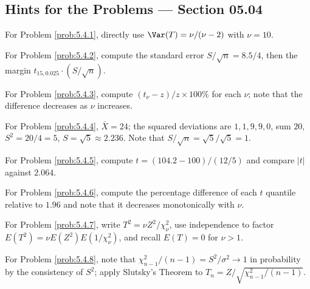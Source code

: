 \subsection*{Hints for the Problems --- Section 05.04}

\begin{sugerencia}
	\label{sug:5.4.1}
	For Problem \ref{prob:5.4.1}, directly use $\Var(T)=\nu/(\nu-2)$ with $\nu=10$.
\end{sugerencia}

\begin{sugerencia}
	\label{sug:5.4.2}
	For Problem \ref{prob:5.4.2}, compute the standard error $S/\sqrt n = 8.5/4$, then the margin $t_{15,0.025}\cdot(S/\sqrt n)$.
\end{sugerencia}

\begin{sugerencia}
	\label{sug:5.4.3}
	For Problem \ref{prob:5.4.3}, compute $(t_\nu-z)/z \times 100\%$ for each $\nu$; note that the difference decreases as $\nu$ increases.
\end{sugerencia}

\begin{sugerencia}
	\label{sug:5.4.4}
	For Problem \ref{prob:5.4.4}, $\bar X=24$; the squared deviations are $1,1,9,9,0$, sum $20$, $S^2=20/4=5$, $S=\sqrt 5\approx 2.236$. Note that $S/\sqrt n = \sqrt5/\sqrt5=1$.
\end{sugerencia}

\begin{sugerencia}
	\label{sug:5.4.5}
	For Problem \ref{prob:5.4.5}, compute $t=(104.2-100)/(12/5)$ and compare $|t|$ against $2.064$.
\end{sugerencia}

\begin{sugerencia}
	\label{sug:5.4.6}
	For Problem \ref{prob:5.4.6}, compute the percentage difference of each $t$ quantile relative to $1.96$ and note that it decreases monotonically with $\nu$.
\end{sugerencia}

\begin{sugerencia}
	\label{sug:5.4.7}
	For Problem \ref{prob:5.4.7}, write $T^2=\nu Z^2/\chi^2_\nu$, use independence to factor $E(T^2)=\nu E(Z^2)E(1/\chi^2_\nu)$, and recall $E(T)=0$ for $\nu>1$.
\end{sugerencia}

\begin{sugerencia}
	\label{sug:5.4.8}
	For Problem \ref{prob:5.4.8}, note that $\chi^2_{n-1}/(n-1)=S^2/\sigma^2 \to 1$ in probability by the consistency of $S^2$; apply Slutsky's Theorem to $T_n=Z/\sqrt{\chi^2_{n-1}/(n-1)}$.
\end{sugerencia}

